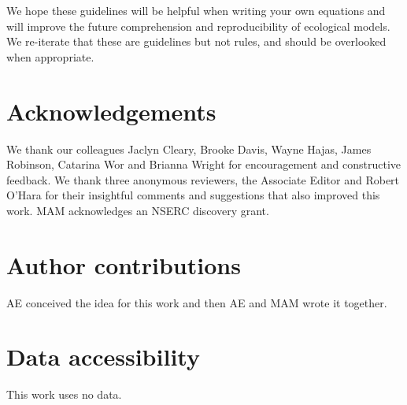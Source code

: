 We hope these guidelines will be helpful when writing your own equations and
will improve the future comprehension and reproducibility of ecological models.
We re-iterate that
these are guidelines but not rules, and should be overlooked when appropriate.

\section*{Acknowledgements}

We thank our colleagues
Jaclyn Cleary,
Brooke Davis,
Wayne Hajas,
James Robinson,
Catarina Wor
and Brianna Wright
for encouragement and constructive feedback.
We thank three anonymous reviewers, the Associate Editor and Robert O'Hara
for their insightful comments and suggestions that also improved this work.
MAM acknowledges an NSERC discovery grant.

\section*{Author contributions} AE conceived the idea for this work
and then AE and MAM wrote it together.

\section*{Data accessibility}

This work uses no data.



\clearpage

\thispagestyle{empty}






\begin{frame}
\frametitle{}
\bi
  \item
\ei
\end{frame}

